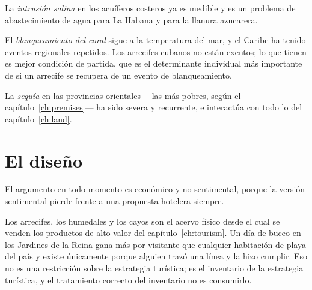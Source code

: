 La \emph{intrusión salina} en los acuíferos costeros ya es medible y es un problema de
abastecimiento de agua para La Habana y para la llanura azucarera.

El \emph{blanqueamiento del coral} sigue a la temperatura del mar, y el Caribe ha tenido eventos
regionales repetidos. Los arrecifes cubanos no están exentos; lo que tienen es mejor condición de
partida, que es el determinante individual más importante de si un arrecife se recupera de un
evento de blanqueamiento.

La \emph{sequía} en las provincias orientales ---las más pobres, según el
capítulo~\ref{ch:premises}--- ha sido severa y recurrente, e interactúa con todo lo del
capítulo~\ref{ch:land}.

\section{El diseño}

El argumento en todo momento es económico y no sentimental, porque la versión sentimental pierde
frente a una propuesta hotelera siempre.

Los arrecifes, los humedales y los cayos son el acervo físico desde el cual se venden los
productos de alto valor del capítulo~\ref{ch:tourism}. Un día de buceo en los Jardines de la Reina
gana más por visitante que cualquier habitación de playa del país y existe únicamente porque
alguien trazó una línea y la hizo cumplir. Eso no es una restricción sobre la estrategia
turística; es el inventario de la estrategia turística, y el tratamiento correcto del inventario
no es consumirlo.


